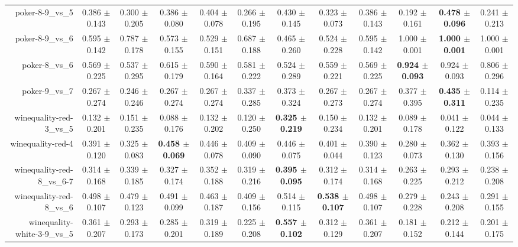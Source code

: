 \begin{table}[!ht]
{\begin{tabular}{r c c c c c c c c c c c}
poker-8-9\_vs\_5 & 0.386 $\pm$ 0.143 & 0.300 $\pm$ 0.205 & 0.386 $\pm$ 0.080 & 0.404 $\pm$ 0.078 & 0.266 $\pm$ 0.195 & 0.430 $\pm$ 0.145 & 0.323 $\pm$ 0.073 & 0.386 $\pm$ 0.143 & 0.192 $\pm$ 0.161 & \textbf{0.478 $\pm$ 0.096} & 0.241 $\pm$ 0.213 \\
poker-8-9\_vs\_6 & 0.595 $\pm$ 0.142 & 0.787 $\pm$ 0.178 & 0.573 $\pm$ 0.155 & 0.529 $\pm$ 0.151 & 0.687 $\pm$ 0.188 & 0.465 $\pm$ 0.260 & 0.524 $\pm$ 0.228 & 0.595 $\pm$ 0.142 & 1.000 $\pm$ 0.001 & \textbf{1.000 $\pm$ 0.001} & 1.000 $\pm$ 0.001 \\
poker-8\_vs\_6 & 0.569 $\pm$ 0.225 & 0.537 $\pm$ 0.295 & 0.615 $\pm$ 0.179 & 0.590 $\pm$ 0.164 & 0.581 $\pm$ 0.222 & 0.524 $\pm$ 0.289 & 0.559 $\pm$ 0.221 & 0.569 $\pm$ 0.225 & \textbf{0.924 $\pm$ 0.093} & 0.924 $\pm$ 0.093 & 0.806 $\pm$ 0.296 \\
poker-9\_vs\_7 & 0.267 $\pm$ 0.274 & 0.246 $\pm$ 0.246 & 0.267 $\pm$ 0.274 & 0.267 $\pm$ 0.274 & 0.337 $\pm$ 0.285 & 0.373 $\pm$ 0.324 & 0.267 $\pm$ 0.273 & 0.267 $\pm$ 0.274 & 0.377 $\pm$ 0.395 & \textbf{0.435 $\pm$ 0.311} & 0.114 $\pm$ 0.235 \\
winequality-red-3\_vs\_5 & 0.132 $\pm$ 0.201 & 0.151 $\pm$ 0.235 & 0.088 $\pm$ 0.176 & 0.132 $\pm$ 0.202 & 0.120 $\pm$ 0.250 & \textbf{0.325 $\pm$ 0.219} & 0.150 $\pm$ 0.234 & 0.132 $\pm$ 0.201 & 0.089 $\pm$ 0.178 & 0.041 $\pm$ 0.122 & 0.044 $\pm$ 0.133 \\
winequality-red-4 & 0.391 $\pm$ 0.120 & 0.325 $\pm$ 0.083 & \textbf{0.458 $\pm$ 0.069} & 0.446 $\pm$ 0.078 & 0.409 $\pm$ 0.090 & 0.446 $\pm$ 0.075 & 0.401 $\pm$ 0.044 & 0.390 $\pm$ 0.123 & 0.280 $\pm$ 0.073 & 0.362 $\pm$ 0.130 & 0.393 $\pm$ 0.156 \\
winequality-red-8\_vs\_6-7 & 0.314 $\pm$ 0.168 & 0.339 $\pm$ 0.185 & 0.327 $\pm$ 0.174 & 0.352 $\pm$ 0.188 & 0.319 $\pm$ 0.216 & \textbf{0.395 $\pm$ 0.095} & 0.312 $\pm$ 0.174 & 0.314 $\pm$ 0.168 & 0.263 $\pm$ 0.225 & 0.293 $\pm$ 0.212 & 0.238 $\pm$ 0.208 \\
winequality-red-8\_vs\_6 & 0.498 $\pm$ 0.107 & 0.479 $\pm$ 0.123 & 0.491 $\pm$ 0.099 & 0.463 $\pm$ 0.187 & 0.409 $\pm$ 0.156 & 0.514 $\pm$ 0.115 & \textbf{0.538 $\pm$ 0.107} & 0.498 $\pm$ 0.107 & 0.279 $\pm$ 0.228 & 0.243 $\pm$ 0.208 & 0.291 $\pm$ 0.155 \\
winequality-white-3-9\_vs\_5 & 0.361 $\pm$ 0.207 & 0.293 $\pm$ 0.173 & 0.285 $\pm$ 0.201 & 0.319 $\pm$ 0.189 & 0.225 $\pm$ 0.208 & \textbf{0.557 $\pm$ 0.102} & 0.312 $\pm$ 0.129 & 0.361 $\pm$ 0.207 & 0.181 $\pm$ 0.152 & 0.212 $\pm$ 0.144 & 0.201 $\pm$ 0.175 \\

\end{tabular}}
\end{table}
